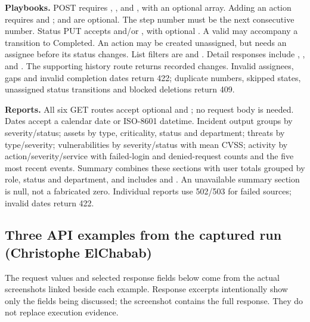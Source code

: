 \textbf{Playbooks.} POST requires , ,  and , with an optional  array. Adding an action requires  and ;  and  are optional. The step number must be the next consecutive number. Status PUT accepts  and/or , with optional . A valid  may accompany a transition to Completed. An action may be created unassigned, but needs an assignee before its status changes. List filters are  and . Detail responses include , ,  and . The supporting history route returns recorded changes. Invalid assignees, gaps and invalid completion dates return 422; duplicate numbers, skipped states, unassigned status transitions and blocked deletions return 409.

\textbf{Reports.} All six GET routes accept optional  and ; no request body is needed. Dates accept a calendar date or ISO-8601 datetime. Incident output groups by severity/status; assets by type, criticality, status and department; threats by type/severity; vulnerabilities by severity/status with mean CVSS; activity by action/severity/service with failed-login and denied-request counts and the five most recent events. Summary combines these sections with user totals grouped by role, status and department, and includes  and . An unavailable summary section is null, not a fabricated zero. Individual reports use 502/503 for failed sources; invalid dates return 422.

\subsection{Three API examples from the captured run (Christophe ElChabab)}
The request values and selected response fields below come from the actual screenshots linked beside each example. Response excerpts intentionally show only the fields being discussed; the screenshot contains the full response. They do not replace execution evidence.

